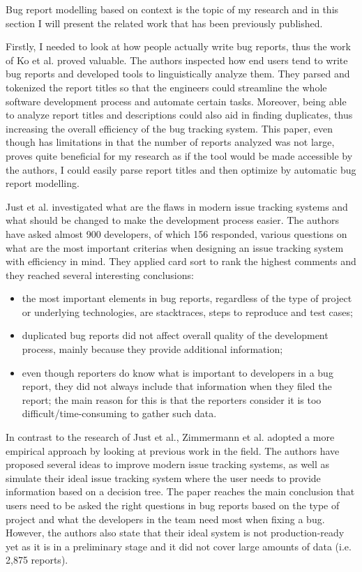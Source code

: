 \documentclass[11pt,english,twocolumn]{article}
\begin{document}
Bug report modelling based on context is the topic of my research and in this
section I will present the related work that has been previously published.

Firstly, I needed to look at how people actually write bug reports,
thus the work of Ko et al. \cite{ko2006linguistic} proved valuable. The
authors inspected how end users tend to write bug reports and developed 
tools to linguistically analyze them. They parsed and tokenized the report
titles so that the engineers could streamline the whole software development
process and automate certain tasks. Moreover, being able to analyze
report titles and descriptions could also aid in finding duplicates, thus
increasing the overall efficiency of the bug tracking system. This paper,
even though has limitations in that the number of reports analyzed was
not large, proves quite beneficial for my research as if the tool would
be made accessible by the authors, I could easily parse report titles
and then optimize by automatic bug report modelling.

Just et al.\cite{just2008towards} investigated what are the flaws in 
modern issue tracking systems and what should be changed to make the development
process easier. The authors have asked almost 900 developers, of which
156 responded, various questions on what are the most important criterias
when designing an issue tracking system with efficiency in mind. They
applied card sort to rank the highest comments and they reached several
interesting conclusions:
  \begin{itemize}
    \item the most important elements in bug reports, regardless of the
    type of project or underlying technologies, are stacktraces, steps
    to reproduce and test cases;
    \item duplicated bug reports did not affect overall quality of the 
    development process, mainly because they provide additional information;
    \item even though reporters do know what is important to developers
    in a bug report, they did not always include that information when
    they filed the report; the main reason for this is that the reporters
    consider it is too difficult/time-consuming to gather such data.
  \end{itemize}

In contrast to the research of Just et al.\cite{just2008towards}, 
Zimmermann et al.\cite{zimmermann2009improving} adopted a more empirical
approach by looking at previous work in the field. The authors have
proposed several ideas to improve modern issue tracking systems, as well
as simulate their ideal issue tracking system where the user needs to
provide information based on a decision tree. The paper reaches the
main conclusion that users need to be asked the right questions in
bug reports based on the type of project and what the developers in the
team need most when fixing a bug. However, the authors also state that
their ideal system is not production-ready yet as it is in a preliminary
stage and it did not cover large amounts of data (i.e. 2,875 reports).
\end{document}
